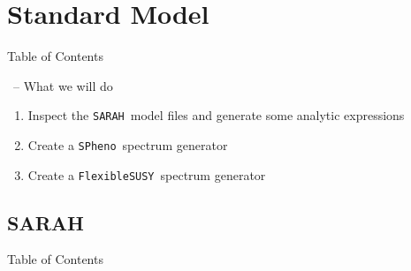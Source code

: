 \documentclass[11pt]{beamer}
\newcommand{\FlexibleSUSY}{\texttt{FlexibleSUSY}}
\newcommand{\SARAH}{\texttt{SARAH}}
\newcommand{\SPheno}{\texttt{SPheno}}
\begin{document}

\section{Standard Model}


\begin{frame}{Table of Contents}
  \tableofcontents[currentsection]
\end{frame}


\begin{frame}[fragile]{\insertsection\ -- What we will do}
  \begin{enumerate}
  \item Inspect the \SARAH\ model files and generate some analytic
    expressions
  \item Create a \SPheno\ spectrum generator
  \item Create a \FlexibleSUSY\ spectrum generator
  \end{enumerate}
\end{frame}


\subsection{SARAH}


\begin{frame}{Table of Contents}
\end{frame}

\end{document}
